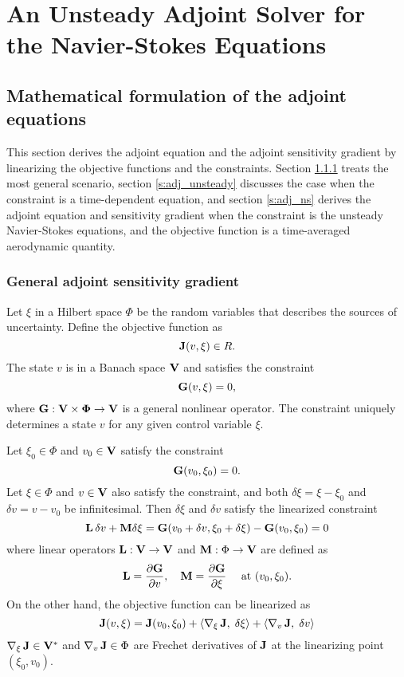 \chapter[An Unsteady Adjoint Navier-Stokes Solver]
        {An Unsteady Adjoint Solver for the Navier-Stokes Equations}

\section{Mathematical formulation of the adjoint equations}

This section derives the adjoint equation and the adjoint sensitivity gradient
by linearizing the objective functions and the constraints.  Section 
\ref{s:adj_general} treats the most general scenario,
section \ref{s:adj_unsteady} discusses the case when the constraint is a
time-dependent equation, and section \ref{s:adj_ns} derives the adjoint
equation and sensitivity gradient when the constraint is the unsteady
Navier-Stokes equations, and the objective function is a time-averaged
aerodynamic quantity.

\subsection{General adjoint sensitivity gradient} \label{s:adj_general}

Let $\xi$ in a Hilbert space $\Phi$ be the random variables that describes
the sources of uncertainty.  Define the objective function as
$${\bf J}(v,\xi) \in R.$$
The state $v$ is in a Banach space $\bf V$ and satisfies the constraint
$${\bf G}(v,\xi) = 0,$$
where $\bf G: {\bf V} \times \Phi \rightarrow {\bf V}$ is a general nonlinear
operator.  The constraint uniquely determines a state $v$ for any given control
variable $\xi$.

Let $\xi_0 \in \Phi$ and $v_0 \in {\bf V}$ satisfy the constraint
$${\bf G}(v_0,\xi_0) = 0.$$
Let $\xi \in \Phi$ and $v \in {\bf V}$ also satisfy the constraint, and
both $\delta\xi = \xi - \xi_0$ and $\delta v = v - v_0$ be infinitesimal.
Then $\delta\xi$ and $\delta v$ satisfy the linearized
constraint
$$ {\bf L}\, \delta v + {\bf M} \delta \xi =
   {\bf G}(v_0+\delta v, \xi_0+\delta \xi) - {\bf G}(v_0, \xi_0) = 0 $$
where linear operators ${\bf L}: {\bf V} \rightarrow {\bf V}$ and
${\bf M}: \Phi \rightarrow {\bf V}$ are defined as
$$ {\bf L} = \frac{\partial {\bf G}}{\partial v},\quad
   {\bf M} = \frac{\partial {\bf G}}{\partial \xi} \quad
   \mbox{ at } (v_0, \xi_0). $$
On the other hand, the objective function can be linearized as
$$ {\bf J}(v,\xi) = {\bf J}(v_0,\xi_0)
   + \langle\nabla_{\xi}\, {\bf J},\;\delta\xi\rangle
   + \langle\nabla_v\, {\bf J},\;\delta v\rangle $$
$\nabla_{\xi}\, {\bf J} \in {\bf V}^*$ and $\nabla_v\, {\bf J} \in \Phi$
are Frechet derivatives of $\bf J$ at the linearizing point $(\xi_0,v_0)$.


